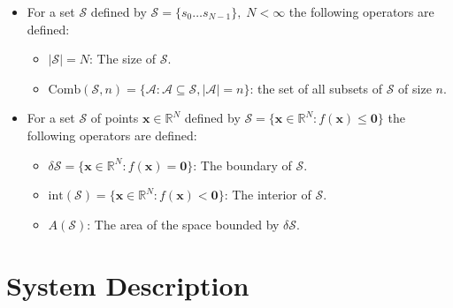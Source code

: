\begin{itemize}
  \item For a set $\mathcal{S}$ defined by $\mathcal{S} = \{s_{0}\hdots s_{N-1}\},\;N<\infty$ the following operators are defined:
  \begin{itemize}
    \item $|\mathcal{S}| = N$: The size of $\mathcal{S}$.
    \item $\mathrm{Comb}(\mathcal{S}, n) = \{\mathcal{A}: \mathcal{A}\subseteq\mathcal{S}, |\mathcal{A}|=n\}$: the set of all subsets of $\mathcal{S}$ of size $n$.
  \end{itemize}
  \item For a set $\mathcal{S}$ of points $\mathbf{x}\in\mathbb{R}^{N}$ defined by $\mathcal{S} = \{\mathbf{x}\in\mathbb{R}^{N}: f(\mathbf{x})\leq\mathbf{0}\}$ the following operators are defined:
  \begin{itemize}
    \item $\delta\mathcal{S} = \{\mathbf{x}\in\mathbb{R}^{N}: f(\mathbf{x}) = \mathbf{0}\}$: The boundary of $\mathcal{S}$.
    \item $\mathrm{int}(\mathcal{S}) = \{\mathbf{x}\in\mathbb{R}^{N}: f(\mathbf{x}) < \mathbf{0}\}$: The interior of $\mathcal{S}$.
    \item $A(\mathcal{S})$: The area of the space bounded by $\delta\mathcal{S}$.
  \end{itemize}
\end{itemize}
\clearpage

\section{System Description}

